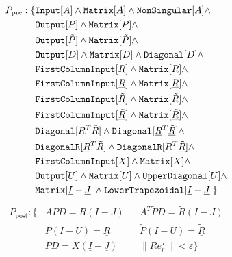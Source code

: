 \begin{align*}
P_\text{pre}: \{ &\text{\ttfamily Input}[A] \land \text{\ttfamily Matrix}[A] \land \text{\ttfamily NonSingular}[A] \land \\
		&\text{\ttfamily Output}[P] \land \text{\ttfamily Matrix}[P] \land \\
		&\text{\ttfamily Output}[\tilde{P}] \land \text{\ttfamily Matrix}[\tilde{P}] \land \\
		&\text{\ttfamily Output}[D] \land \text{\ttfamily Matrix}[D] \land \text{\ttfamily Diagonal}[D] \land \\
		&\text{\ttfamily FirstColumnInput}[R] \land \text{\ttfamily Matrix}[R] \land \\
		&\text{\ttfamily FirstColumnInput}[\underline{R}] \land \text{\ttfamily Matrix}[\underline{R}]  \land \\
		&\text{\ttfamily FirstColumnInput}[\tilde{R}] \land \text{\ttfamily Matrix}[\tilde{R}] \land  \\
		&\text{\ttfamily FirstColumnInput}[\underline{\tilde{R}}] \land \text{\ttfamily Matrix}[\underline{\tilde{R}}] \land \\
		&\text{\ttfamily Diagonal}[R^T \tilde{R}] \land \text{\ttfamily Diagonal}[\underline{R}^T \underline{\tilde{R}}] \land \\
		&\text{\ttfamily DiagonalR}[\underline{R}^T \tilde{R}] \land \text{\ttfamily DiagonalR}[R^T \underline{\tilde{R}}] \land \\
		&\text{\ttfamily FirstColumnInput}[X] \land \text{\ttfamily Matrix}[X] \land \\
		&\text{\ttfamily Output}[U] \land \text{\ttfamily Matrix}[U] \land \text{\ttfamily UpperDiagonal}[U] \land \\
		& \text{\ttfamily Matrix}[\underline{I} - \underline{J}] \land \text{\ttfamily LowerTrapezoidal}[\underline{I} - \underline{J}] \}
\end{align*}
%
\begin{align*}
P_\text{post}:	\{ 	&APD = R \left( \underline{I} - \underline{J} \right) 
				&&A^T \tilde{P}D = \tilde{R} \left( \underline{I} - \underline{J} \right) \\
				&P \left( I - U \right) = \underline{R}
				&&\tilde{P} \left( I - U \right) = \underline{\tilde{R}} \\
				&PD = X \left( \underline{I} - \underline{J} \right) 
				&&\| R e_r^T \| < \varepsilon \}
\end{align*}




